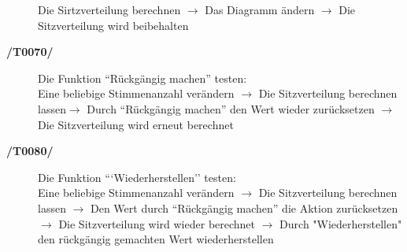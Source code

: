 \documentclass[10pt,a4paper]{article}
\begin{document}
\begin{description}
	Die Sirtzverteilung berechnen $\rightarrow$ Das Diagramm ändern $\rightarrow$ Die Sitzverteilung wird beibehalten
	\item[\textbf{/T0070/}] Die Funktion ``Rückgängig machen'' testen: \\
	Eine beliebige Stimmenanzahl verändern $\rightarrow$ Die Sitzverteilung berechnen lassen$\rightarrow$ Durch ``Rückgängig machen'' den Wert wieder zurücksetzen $\rightarrow$ Die Sitzverteilung wird erneut berechnet
	\item[\textbf{/T0080/}] Die Funktion ```Wiederherstellen'' testen: \\
	Eine beliebige Stimmenanzahl verändern $\rightarrow$ Die Sitzverteilung berechnen lassen $\rightarrow$ Den Wert durch ``Rückgängig machen'' die Aktion zurücksetzen $\rightarrow$ Die Sitzverteilung wird wieder berechnet $\rightarrow$ Durch "Wiederherstellen" den rückgängig gemachten Wert wiederherstellen
\end{description}
\end{document}
